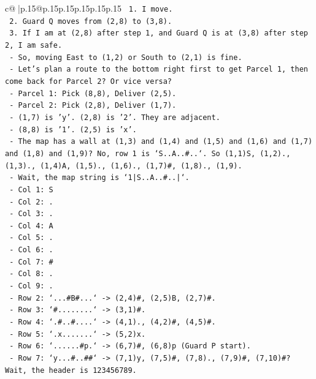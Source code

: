 \documentclass{article}
\begin{document}
{\begin{supertabular}{c@{$\;$}|p{.15\linewidth}@{}p{.15\linewidth}p{.15\linewidth}p{.15\linewidth}p{.15\linewidth}p{.15\linewidth}}
{{{\texttt{    1. I move.} \\
\texttt{    2. Guard Q moves from (2,8) to (3,8).} \\
\texttt{    3. If I am at (2,8) after step 1, and Guard Q is at (3,8) after step 2, I am safe.} \\
\texttt{  {-} So, moving East to (1,2) or South to (2,1) is fine.} \\
\texttt{  {-} Let's plan a route to the bottom right first to get Parcel 1, then come back for Parcel 2? Or vice versa?} \\
\texttt{  {-} Parcel 1: Pick (8,8), Deliver (2,5).} \\
\texttt{  {-} Parcel 2: Pick (2,8), Deliver (1,7).} \\
\texttt{  {-} (1,7) is 'y'. (2,8) is '2'. They are adjacent.} \\
\texttt{  {-} (8,8) is '1'. (2,5) is 'x'.} \\
\texttt{  {-} The map has a wall at (1,3) and (1,4) and (1,5) and (1,6) and (1,7) and (1,8) and (1,9)? No, row 1 is `S..A..\#..`. So (1,1)S, (1,2)., (1,3)., (1,4)A, (1,5)., (1,6)., (1,7)\#, (1,8)., (1,9).} \\
\texttt{  {-} Wait, the map string is `1|S..A..\#..|`.} \\
\texttt{    {-} Col 1: S} \\
\texttt{    {-} Col 2: .} \\
\texttt{    {-} Col 3: .} \\
\texttt{    {-} Col 4: A} \\
\texttt{    {-} Col 5: .} \\
\texttt{    {-} Col 6: .} \\
\texttt{    {-} Col 7: \#} \\
\texttt{    {-} Col 8: .} \\
\texttt{    {-} Col 9: .} \\
\texttt{  {-} Row 2: `...\#B\#...` {-}> (2,4)\#, (2,5)B, (2,7)\#.} \\
\texttt{  {-} Row 3: `\#........` {-}> (3,1)\#.} \\
\texttt{  {-} Row 4: `.\#..\#....` {-}> (4,1)., (4,2)\#, (4,5)\#.} \\
\texttt{  {-} Row 5: `.x.......` {-}> (5,2)x.} \\
\texttt{  {-} Row 6: `......\#p.` {-}> (6,7)\#, (6,8)p (Guard P start).} \\
\texttt{  {-} Row 7: `y...\#..\#\#` {-}> (7,1)y, (7,5)\#, (7,8)., (7,9)\#, (7,10)\#? Wait, the header is 123456789.} \\
}}}
\end{supertabular}}
\end{document}
